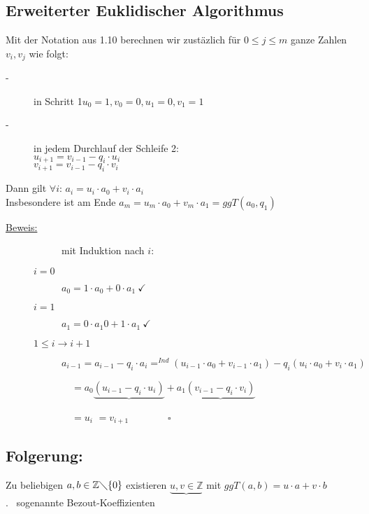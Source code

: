 \subsection{Erweiterter Euklidischer Algorithmus}
Mit der Notation aus 1.10 berechnen wir zustäzlich für $0 \leq j \leq m$ ganze Zahlen $v_{i},v_{j}$ wie folgt:
\begin{description}
	\item[-] in Schritt 1$u_{0} = 1, v_{0}=0, u_{1}=0, v_{1}=1$
	\item[-] in jedem Durchlauf der Schleife 2: \\
			$u_{i+1} = v_{i-1} - q_{i} \cdot u_{i}$\\
			$v_{i+1} = v_{i-1} - q_{i} \cdot v_{i}$
\end{description}
Dann gilt $\forall i$: $a_{i} = u_{i} \cdot a_{0} + v_{i} \cdot a_{i}$ \\
Insbesondere ist am Ende $a_{m} = u_{m} \cdot a_{0} + v_{m} \cdot a_{1} = ggT (a_{0}, q_{1})$
	\begin{description}
		\item[\underline{Beweis:}]
		\begin{description}
			\item[] mit Induktion nach $i$:
			\item[\underline{$i = 0$}] $a_{0} = 1 \cdot a_{0} + 0 \cdot a_{1}\  \checkmark $
			\item[\underline{$i = 1$}] $a_{1} = 0 \cdot a_1{0} + 1 \cdot a_{1} \ \checkmark $
			\item[\underline{$1\leq i \rightarrow i + 1$}] $a_{i-1} = a_{i-1} - q_{i} \cdot a_{i} =^{Ind}(u_{i-1} \cdot 
						a_{0} + v_{i-1} \cdot a_{1}) - q_{i}(u_{i} \cdot a_{0} + v_{i} \cdot a_{1})$
			\item[\qquad] \ \ \qquad $ = a_{0} \underbrace{(u_{i-1}-q_{i} \cdot u_{i})} + a_{1}\underbrace{(v_{i-1} 
						- q_{i}\cdot v_{i})}$
			\item[\qquad] \ \ \qquad \qquad \qquad $= u_{i}$ \qquad \qquad \qquad $= v_{i+1} \qquad \qquad 
						\square$
		\end{description}
	\end{description}
%
%
%
\subsection{Folgerung:}
Zu beliebigen $a,b \in \mathbb{Z} \diagdown\{0\}$ existieren $\underbrace{u,v \in \mathbb{Z}}$ mit $ggT(a,b) = u \cdot a+ v \cdot b$\\
.  \qquad \qquad \qquad \qquad \qquad \ sogenannte Bezout-Koeffizienten
%
%
%
